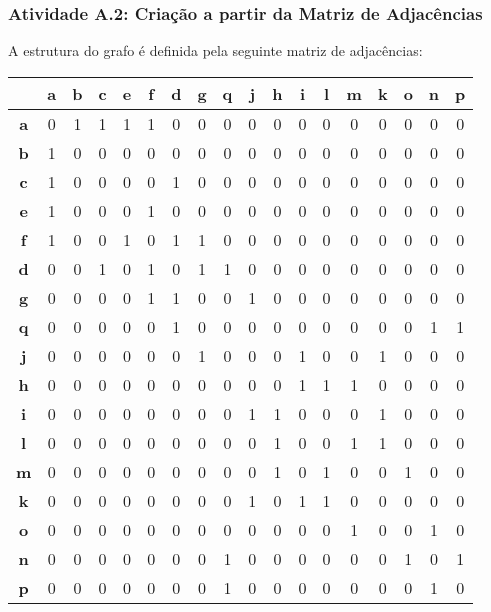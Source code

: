 \documentclass[a4paper,12pt]{article}
\begin{document}
\subsubsection*{Atividade A.2: Criação a partir da Matriz de Adjacências}
A estrutura do grafo é definida pela seguinte matriz de adjacências:
\begin{center}
\tiny
\begin{tabular*}{\textwidth}{c|@{\extracolsep{\fill}}ccccccccccccccccc}
\rowcolor[gray]{0.9}
 & \textbf{a} & \textbf{b} & \textbf{c} & \textbf{e} & \textbf{f} & \textbf{d} & \textbf{g} & \textbf{q} & \textbf{j} & \textbf{h} & \textbf{i} & \textbf{l} & \textbf{m} & \textbf{k} & \textbf{o} & \textbf{n} & \textbf{p} \\
\hline
\textbf{a} & 0 & 1 & 1 & 1 & 1 & 0 & 0 & 0 & 0 & 0 & 0 & 0 & 0 & 0 & 0 & 0 & 0 \\
\textbf{b} & 1 & 0 & 0 & 0 & 0 & 0 & 0 & 0 & 0 & 0 & 0 & 0 & 0 & 0 & 0 & 0 & 0 \\
\textbf{c} & 1 & 0 & 0 & 0 & 0 & 1 & 0 & 0 & 0 & 0 & 0 & 0 & 0 & 0 & 0 & 0 & 0 \\
\textbf{e} & 1 & 0 & 0 & 0 & 1 & 0 & 0 & 0 & 0 & 0 & 0 & 0 & 0 & 0 & 0 & 0 & 0 \\
\textbf{f} & 1 & 0 & 0 & 1 & 0 & 1 & 1 & 0 & 0 & 0 & 0 & 0 & 0 & 0 & 0 & 0 & 0 \\
\textbf{d} & 0 & 0 & 1 & 0 & 1 & 0 & 1 & 1 & 0 & 0 & 0 & 0 & 0 & 0 & 0 & 0 & 0 \\
\textbf{g} & 0 & 0 & 0 & 0 & 1 & 1 & 0 & 0 & 1 & 0 & 0 & 0 & 0 & 0 & 0 & 0 & 0 \\
\textbf{q} & 0 & 0 & 0 & 0 & 0 & 1 & 0 & 0 & 0 & 0 & 0 & 0 & 0 & 0 & 0 & 1 & 1 \\
\textbf{j} & 0 & 0 & 0 & 0 & 0 & 0 & 1 & 0 & 0 & 0 & 1 & 0 & 0 & 1 & 0 & 0 & 0 \\
\textbf{h} & 0 & 0 & 0 & 0 & 0 & 0 & 0 & 0 & 0 & 0 & 1 & 1 & 1 & 0 & 0 & 0 & 0 \\
\textbf{i} & 0 & 0 & 0 & 0 & 0 & 0 & 0 & 0 & 1 & 1 & 0 & 0 & 0 & 1 & 0 & 0 & 0 \\
\textbf{l} & 0 & 0 & 0 & 0 & 0 & 0 & 0 & 0 & 0 & 1 & 0 & 0 & 1 & 1 & 0 & 0 & 0 \\
\textbf{m} & 0 & 0 & 0 & 0 & 0 & 0 & 0 & 0 & 0 & 1 & 0 & 1 & 0 & 0 & 1 & 0 & 0 \\
\textbf{k} & 0 & 0 & 0 & 0 & 0 & 0 & 0 & 0 & 1 & 0 & 1 & 1 & 0 & 0 & 0 & 0 & 0 \\
\textbf{o} & 0 & 0 & 0 & 0 & 0 & 0 & 0 & 0 & 0 & 0 & 0 & 0 & 1 & 0 & 0 & 1 & 0 \\
\textbf{n} & 0 & 0 & 0 & 0 & 0 & 0 & 0 & 1 & 0 & 0 & 0 & 0 & 0 & 0 & 1 & 0 & 1 \\
\textbf{p} & 0 & 0 & 0 & 0 & 0 & 0 & 0 & 1 & 0 & 0 & 0 & 0 & 0 & 0 & 0 & 1 & 0 \\
\end{tabular*}
\end{center}
\end{document}
